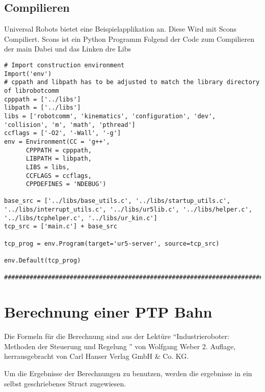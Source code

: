 \documentclass[
a4paper,
12pt,
oneside,
headsepline,		%
footsepline,		%
]{scrbook}
\begin{document}
\section{Compilieren}

Universal Robots bietet eine Beispielapplikation an. Diese Wird mit Scons Compiliert. Scons ist ein Python Programm
Folgend der Code zum Compilieren der main Dabei und das Linken dre Libs

\begin{lstlisting}
# Import construction environment
Import('env')
# cppath and libpath has to be adjusted to match the library directory of librobotcomm
cpppath = ['../libs']
libpath = ['../libs']
libs = ['robotcomm', 'kinematics', 'configuration', 'dev', 'collision', 'm', 'math', 'pthread']
ccflags = ['-O2', '-Wall', '-g']
env = Environment(CC = 'g++',
      CPPPATH = cpppath,
      LIBPATH = libpath,
      LIBS = libs,
      CCFLAGS = ccflags,
      CPPDEFINES = 'NDEBUG')

base_src = ['../libs/base_utils.c', '../libs/startup_utils.c', '../libs/interrupt_utils.c', '../libs/ur5lib.c', '../libs/helper.c', '../libs/tcphelper.c', '../libs/ur_kin.c']
tcp_src = ['main.c'] + base_src

tcp_prog = env.Program(target='ur5-server', source=tcp_src)

env.Default(tcp_prog)

###############################################################################
\end{lstlisting}

\chapter{Berechnung einer PTP Bahn}

Die Formeln für die Berechnung sind aus der Lektüre ``Industrieroboter: Methoden der Steuerung und Regelung '' von Wolfgang Weber 2. Auflage, herrausgebracht von  Carl Hanser Verlag GmbH \& Co. KG.

Um die Ergebnisse der Berechnungen zu benutzen, werden die ergebnisse in ein selbst geschriebenes Struct zugewiesen.
\end{document}
